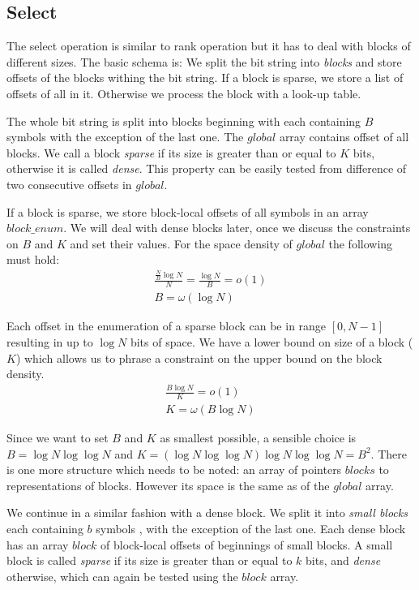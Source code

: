 \subsection{Select}

The select operation is similar to rank operation but it has to deal with blocks of different sizes.
The basic schema is:
We split the bit string into \emph{blocks} and store offsets of the blocks withing the bit string.
If a block is sparse, we store a list of offsets of all \ph{} in it.
Otherwise we process the block with a look-up table.

The whole bit string is split into blocks beginning with \ph{} each containing $B$ symbols \ph{} with the exception of the last one.
The $global$ array contains offset of all blocks.
We call a block \emph{sparse} if its size is greater than or equal to $K$ bits, otherwise it is called \emph{dense}.
This property can be easily tested from difference of two consecutive offsets in $global$.

If a block is sparse, we store block-local offsets of all symbols \ph{} in an array $block\_enum$.
We will deal with dense blocks later, once we discuss the constraints on $B$ and $K$ and set their values.
For the space density of $global$ the following must hold:
\begin{gather*}
\frac{\frac{N}{B} \log N}{N} = \frac{\log N}{B} = o(1) \\
B = \omega(\log N)
\end{gather*}

Each offset in the enumeration of a sparse block can be in range $[0, N-1]$ resulting in up to $\log N$ bits of space.
We have a lower bound on size of a block ($K$) which allows us to phrase a constraint on the upper bound on the block density.
\begin{gather*}
\frac{B \log N}{K} = o(1) \\
K = \omega(B \log N)
\end{gather*}

Since we want to set $B$ and $K$ as smallest possible, a sensible choice is $B = \log N \log \log N$ and $K = (\log N \log \log N) \log N \log \log N = B^2 $.
There is one more structure which needs to be noted: an array of pointers $blocks$ to representations of blocks.
However its space is the same as of the $global$ array.

We continue in a similar fashion with a dense block.
We split it into \emph{small blocks} each containing $b$ symbols \ph, with the exception of the last one.
Each dense block has an array $block$ of block-local offsets of beginnings of small blocks.
A small block is called \emph{sparse} if its size is greater than or equal to $k$ bits, and \emph{dense} otherwise, which can again be tested using the $block$ array.

